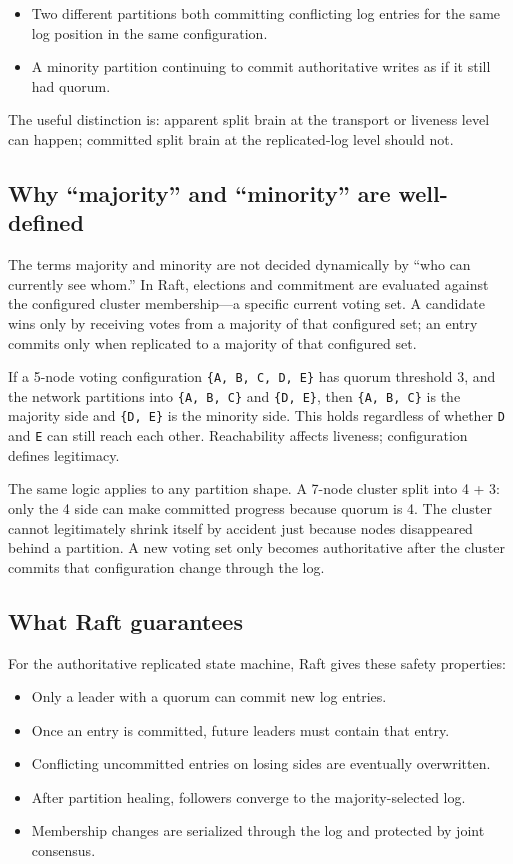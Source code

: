 \begin{itemize}
\item Two different partitions both committing conflicting log entries for
the same log position in the same configuration.
\item A minority partition continuing to commit authoritative writes as if
it still had quorum.
\end{itemize}

The useful distinction is: apparent split brain at the transport or
liveness level can happen; committed split brain at the replicated-log
level should not.

\subsection{Why ``majority'' and ``minority'' are well-defined}

The terms majority and minority are not decided dynamically by ``who can
currently see whom.'' In Raft, elections and commitment are evaluated
against the configured cluster membership---a specific current voting
set. A candidate wins only by receiving votes from a majority of that
configured set; an entry commits only when replicated to a majority of
that configured set.

If a 5-node voting configuration \texttt{\{A, B, C, D, E\}} has quorum
threshold 3, and the network partitions into \texttt{\{A, B, C\}} and
\texttt{\{D, E\}}, then \texttt{\{A, B, C\}} is the majority side and
\texttt{\{D, E\}} is the minority side. This holds regardless of whether
\texttt{D} and \texttt{E} can still reach each other. Reachability affects
liveness; configuration defines legitimacy.

The same logic applies to any partition shape. A 7-node cluster split
into 4 + 3: only the 4 side can make committed progress because quorum
is 4. The cluster cannot legitimately shrink itself by accident just
because nodes disappeared behind a partition. A new voting set only becomes
authoritative after the cluster commits that configuration change through
the log.

\subsection{What Raft guarantees}

For the authoritative replicated state machine, Raft gives these safety
properties:

\begin{itemize}
\item Only a leader with a quorum can commit new log entries.
\item Once an entry is committed, future leaders must contain that entry.
\item Conflicting uncommitted entries on losing sides are eventually
overwritten.
\item After partition healing, followers converge to the majority-selected
log.
\item Membership changes are serialized through the log and protected by
joint consensus.
\end{itemize}

